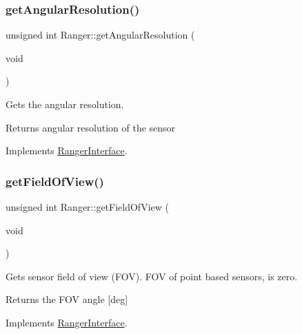 \subsubsection{\texorpdfstring{get\+Angular\+Resolution()}{getAngularResolution()}}
{\footnotesize\ttfamily unsigned int Ranger\+::get\+Angular\+Resolution (\begin{DoxyParamCaption}\item[{void}]{ }\end{DoxyParamCaption})\hspace{0.3cm}{\ttfamily [virtual]}}



Gets the angular resolution. 

\begin{DoxyReturn}{Returns}
angular resolution of the sensor 
\end{DoxyReturn}


Implements \hyperlink{classRangerInterface_a37d4f89daffa8b2708dfc11034893552}{Ranger\+Interface}.

\mbox{\label{classRanger_a4bca7dce56b7959257d90b1f30bf0271}} 
\subsubsection{\texorpdfstring{get\+Field\+Of\+View()}{getFieldOfView()}}
{\footnotesize\ttfamily unsigned int Ranger\+::get\+Field\+Of\+View (\begin{DoxyParamCaption}\item[{void}]{ }\end{DoxyParamCaption})\hspace{0.3cm}{\ttfamily [virtual]}}



Gets sensor field of view (F\+OV). F\+OV of point based sensors, is zero. 

\begin{DoxyReturn}{Returns}
the F\+OV angle \mbox{[}deg\mbox{]} 
\end{DoxyReturn}


Implements \hyperlink{classRangerInterface_a18716da6932402b8dda75f682be6f06c}{Ranger\+Interface}.

\mbox{\label{classRanger_aba5e81260e55089d9ff869051156a722}} 
